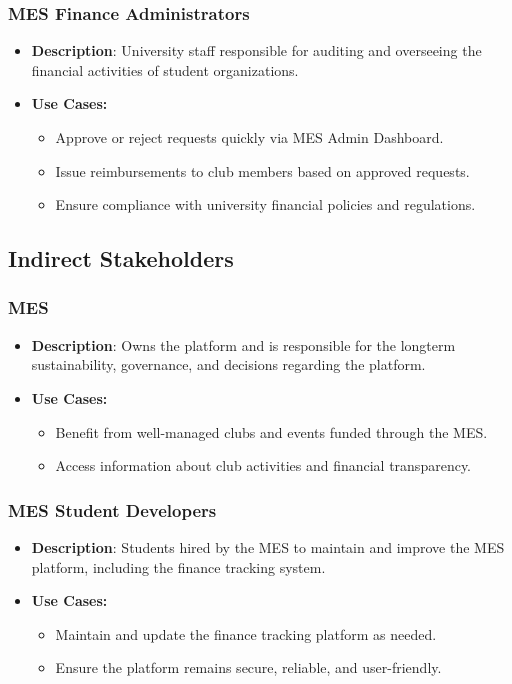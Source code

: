 \documentclass[12pt]{article}
\begin{document}
    \subsubsection{MES Finance Administrators}
      \begin{itemize}
        \item \textbf{Description}: University staff responsible for auditing and overseeing the financial activities of student organizations.
        \item \textbf{Use Cases:}
          \begin{itemize}
            \item Approve or reject requests quickly via MES Admin Dashboard.
            \item Issue reimbursements to club members based on approved requests.
            \item Ensure compliance with university financial policies and regulations.
          \end{itemize}
      \end{itemize}

  \subsection{Indirect Stakeholders}
    \subsubsection{MES}
      \begin{itemize}
        \item \textbf{Description}: Owns the platform and is responsible for the longterm sustainability, governance, and decisions regarding the platform.
        \item \textbf{Use Cases:}
          \begin{itemize}
            \item Benefit from well-managed clubs and events funded through the MES.
            \item Access information about club activities and financial transparency.
          \end{itemize}
      \end{itemize}
    \subsubsection{MES Student Developers}
      \begin{itemize}
        \item \textbf{Description}: Students hired by the MES to maintain and improve the MES platform, including the finance tracking system.
        \item \textbf{Use Cases:}
          \begin{itemize}
            \item Maintain and update the finance tracking platform as needed.
            \item Ensure the platform remains secure, reliable, and user-friendly.
          \end{itemize}
      \end{itemize}
\end{document}

